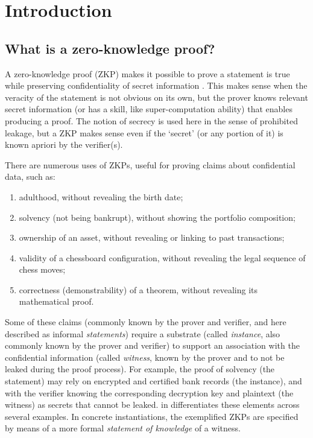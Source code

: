 \section{Introduction}
\label{security:intro}


\subsection{What is a zero-knowledge proof?}
\label{security:intro:what-is-a-ZK}


	A zero-knowledge proof (ZKP) makes it possible to prove a statement is true while preserving confidentiality of secret information \cite{1989:SJC:the-knowledge-complexity-of-interactive-proof-systems}.
	This makes sense when the veracity of the statement is not obvious on its own, but the prover knows relevant secret information (or has a skill, like super-computation ability) that enables producing a proof.
	The notion of secrecy is used here in the sense of prohibited leakage, but a ZKP makes sense even if the `secret' (or any portion of it) is known apriori by the verifier(s).


	There are numerous uses of ZKPs, useful for proving claims about confidential data, such as:
\begin{enumerate}
\item adulthood, without revealing the birth date;
\item solvency (not being bankrupt), without showing the portfolio composition;
\item ownership of an asset, without revealing or linking to past transactions;
\item validity of a chessboard configuration, without revealing the legal sequence of chess moves;
\item correctness (demonstrability) of a theorem, without revealing its mathematical proof.
\end{enumerate}


	Some of these claims (commonly known by the prover and verifier, and here described as informal \emph{statements}) require a substrate (called \emph{instance}, also commonly known by the prover and verifier) to support an association with the confidential information (called \emph{witness}, known by the prover and to not be leaked during the proof process).
	For example, the proof of solvency (the statement) may rely on encrypted and certified bank records (the instance), and with the verifier knowing the corresponding decryption key and plaintext (the witness) as secrets that cannot be leaked.
	 in  differentiates these elements across several examples.
	In concrete instantiations, the exemplified ZKPs are specified by means of a more formal \emph{statement of knowledge} of a witness.
	
